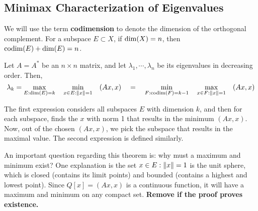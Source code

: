 \subsection{Minimax Characterization of Eigenvalues}

We will use the term \textbf{codimension} to denote the dimension of the orthogonal complement. For a subspace $E \subset X$, if $\operatorname{dim}(X) = n$, then $\operatorname{codim}(E) + \operatorname{dim}(E) = n$. 

\begin{theorem}
Let $A = A^{*}$ be an $n \times n$ matrix, and let $\lambda_{1}, \cdots, \lambda_{n}$ be its eigenvalues in decreasing order. Then, 
$$\lambda_{k} = \max_{E: \operatorname{dim}(E) = k} \quad \min_{x \in E: \norm{x} = 1} \quad (Ax, x) \quad = \quad \min_{F: \operatorname{codim}(F)=k-1} \quad \max_{x \in F: \norm{x} = 1} \quad (Ax, x)$$

\end{theorem}

The first expression considers all subspaces $E$ with dimension $k$, and then for each subspace, finds the $x$ with norm 1 that results in the minimum $(Ax, x)$. Now, out of the chosen $(Ax, x)$, we pick the subspace that results in the maximal value. The second expression is defined similarly. 

An important question regarding this theorem is: why must a maximum and minimum exist? One explanation is the set $x \in E : \norm{x} = 1$ is the unit sphere, which is closed (contains its limit points) and bounded (contains a highest and lowest point). Since $Q[x] = (Ax, x)$ is a continuous function, it will have a maximum and minimum on any compact set. \textbf{Remove if the proof proves existence.}

